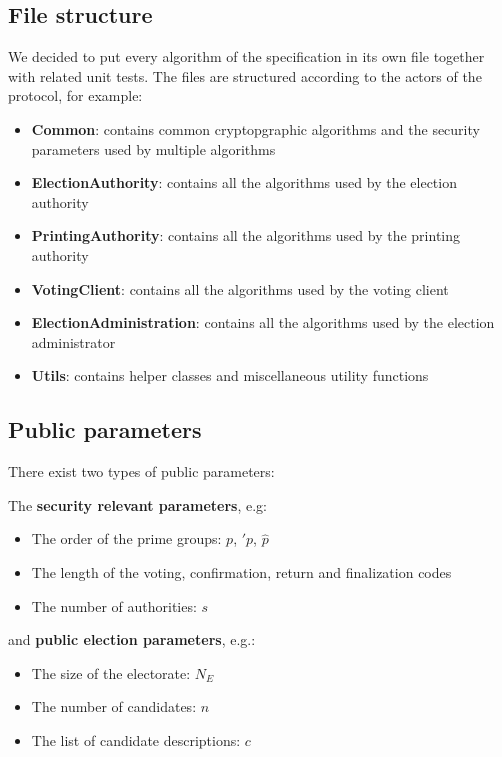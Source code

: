 \subsection{File structure}
We decided to put every algorithm of the specification in its own file together with related unit tests. The files are structured according to the actors of the protocol, for example:

\begin{itemize}
	\item \textbf{Common}: contains common cryptopgraphic algorithms and the security parameters used by multiple algorithms
	\item \textbf{ElectionAuthority}: contains all the algorithms used by the election authority
	\item \textbf{PrintingAuthority}: contains all the algorithms used by the printing authority
	\item \textbf{VotingClient}: contains all the algorithms used by the voting client
	\item \textbf{ElectionAdministration}: contains all the algorithms used by the election administrator
	\item \textbf{Utils}: contains helper classes and miscellaneous utility functions
\end{itemize}

\subsection{Public parameters}
There exist two types of public parameters:

The \textbf{security relevant parameters}, e.g:

\begin{itemize}
	\item The order of the prime groups: $p$, $\prime{p}$, $\hat{p}$
	\item The length of the voting, confirmation, return and finalization codes
	\item The number of authorities: $s$
\end{itemize}

and \textbf{public election parameters}, e.g.:

\begin{itemize}
	\item The size of the electorate: $N_E$
	\item The number of candidates: $n$
	\item The list of candidate descriptions: $c$
\end{itemize}

